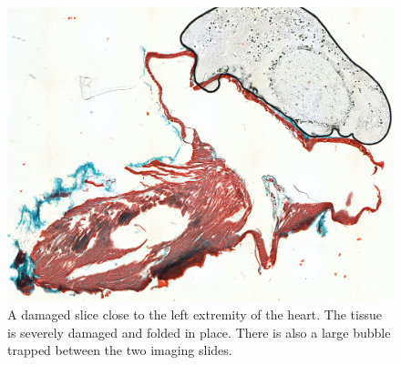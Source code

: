     \begin{figure}
      \centering
      \includegraphics[width=1.3\textwidth]{Ch6/Figs/damaged_slice}
      \caption{A damaged slice close to the left extremity of the heart. The tissue is severely damaged and folded in place. There is also a large bubble trapped between the two imaging slides.}
      \label{fig:damaged_slice}
    \end{figure}
  
    
  
